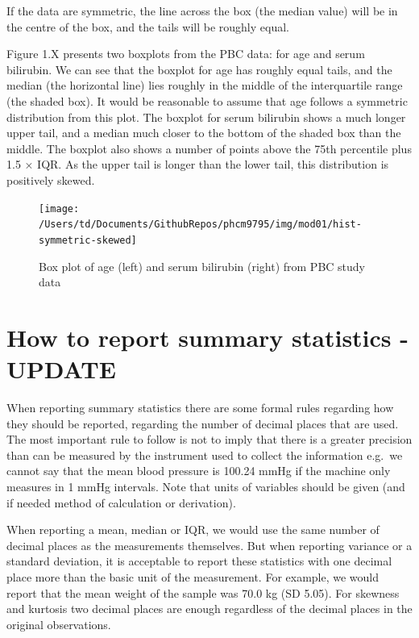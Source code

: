 \documentclass[
]{memoir}
\begin{document}
If the data are symmetric, the line across the box (the median value) will be in the centre of the box, and the tails will be roughly equal.

Figure 1.X presents two boxplots from the PBC data: for age and serum bilirubin. We can see that the boxplot for age has roughly equal tails, and the median (the horizontal line) lies roughly in the middle of the interquartile range (the shaded box). It would be reasonable to assume that age follows a symmetric distribution from this plot. The boxplot for serum bilirubin shows a much longer upper tail, and a median much closer to the bottom of the shaded box than the middle. The boxplot also shows a number of points above the 75th percentile plus 1.5 × IQR. As the upper tail is longer than the lower tail, this distribution is positively skewed.

\begin{figure}
\texttt{[image: /Users/td/Documents/GithubRepos/phcm9795/img/mod01/hist-symmetric-skewed]} \caption{Box plot of age (left) and serum bilirubin (right) from PBC study data}\label{fig:fig-1-7}
\end{figure}

\hypertarget{how-to-report-summary-statistics---update}{%
\section{How to report summary statistics - UPDATE}\label{how-to-report-summary-statistics---update}}

When reporting summary statistics there are some formal rules regarding how they should be reported, regarding the number of decimal places that are used. The most important rule to follow is not to imply that there is a greater precision than can be measured by the instrument used to collect the information e.g.~we cannot say that the mean blood pressure is 100.24 mmHg if the machine only measures in 1 mmHg intervals. Note that units of variables should be given (and if needed method of calculation or derivation).

When reporting a mean, median or IQR, we would use the same number of decimal places as the measurements themselves. But when reporting variance or a standard deviation, it is acceptable to report these statistics with one decimal place more than the basic unit of the measurement. For example, we would report that the mean weight of the sample was 70.0 kg (SD 5.05). For skewness and kurtosis two decimal places are enough regardless of the decimal places in the original observations.
\end{document}
